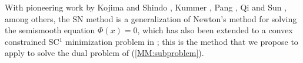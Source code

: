 \documentclass{siamart}
\newcommand{\epc}{\hspace{1pc}}
\begin{document}
With pioneering work by Kojima and Shindo \cite{KojimaShindo1986}, Kummer \cite{Kummer1988}, Pang \cite{Pang1990},
Qi and Sun \cite{QiSun1993}, among others,
the SN method is a generalization of Newton's method for solving the semismooth equation $\Phi(x) = 0$,
which has also been extended to a convex constrained
SC$^1$ minimization problem in \cite{PangQi1995}; this is the method that we propose to apply to solve the dual problem of
(\ref{MM:subproblem}).
\end{document}
